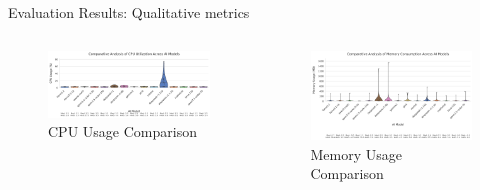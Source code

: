 \documentclass{beamer}
\begin{document}
\begin{frame}{Evaluation Results: Qualitative metrics}
  \begin{columns}[t]
      \begin{figure}
        \centering
        \includegraphics[width=0.9\columnwidth]{model_cpu_usage_comparison.png}
        \caption{CPU Usage Comparison}
        \label{fig:cpu-usage}
      \end{figure}
      \begin{figure}
        \centering
        \includegraphics[width=0.9\columnwidth]{model_memory_usage_comparison.png}
        \caption{Memory Usage Comparison}
        \label{fig:memory-usage}
      \end{figure}
  \end{columns}
\end{frame}

\end{document}
